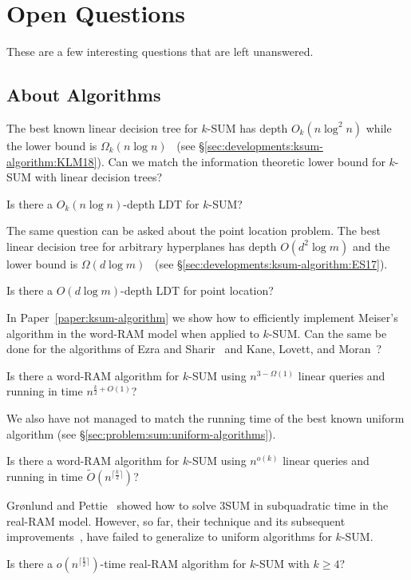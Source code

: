 \chapter{Open Questions}

These are a few interesting questions that are left unanswered.

\section{About Algorithms}

The best known linear decision tree for \(k\)-SUM has depth \(O_k(n \log^2 n)\) while
the lower bound is \(\Omega_k(n \log n)\)~\cite{KLM18}
(see \S\ref{sec:developments:ksum-algorithm:KLM18}).
Can we match the information theoretic lower bound for \(k\)-SUM with linear
decision trees?
\begin{openquestion}
Is there a \(O_k(n \log n)\)-depth LDT for \(k\)-SUM?
\end{openquestion}

The same question can be asked about the point location problem. The best
linear decision tree for arbitrary hyperplanes has depth \(O(d^2 \log m)\)
and the lower bound is \(\Omega(d \log m)\)~\cite{ES17}
(see \S\ref{sec:developments:ksum-algorithm:ES17}).
\begin{openquestion}
Is there a \(O(d \log m)\)-depth LDT for point location?
\end{openquestion}

In Paper~\ref{paper:ksum-algorithm}
we show how to efficiently implement Meiser's algorithm in the word-RAM model
when applied to \(k\)-SUM. Can the same be done for the algorithms of Ezra and
Sharir~\cite{ES17} and Kane, Lovett, and Moran~\cite{KLM18}?
\begin{openquestion}
Is there a word-RAM algorithm for \(k\)-SUM using \(n^{3 - \Omega(1)}\)
linear queries and running in time \(n^{\frac{k}{2}+O(1)}\)?
\end{openquestion}

We also have not managed to match the running time of the best known uniform
algorithm (see \S\ref{sec:problem:sum:uniform-algorithms}).
\begin{openquestion}
Is there a word-RAM algorithm for \(k\)-SUM using \(n^{o(k)}\) linear queries and
running in time \( \tilde{O}(n^{\lceil \frac k2 \rceil})\)?
\end{openquestion}

Gr\o nlund and Pettie~\cite{GP18}
showed how to solve 3SUM in subquadratic time in the real-RAM model.
However, so far, their technique and its subsequent
improvements~\cite{Fr15,GS15,Ch18}, have failed to generalize to uniform algorithms
for \(k\)-SUM.
\begin{openquestion}
	Is there a \(o(n^{\lceil \frac k2 \rceil})\)-time real-RAM algorithm for
	\(k\)-SUM with \(k \geq 4\)?
\end{openquestion}

